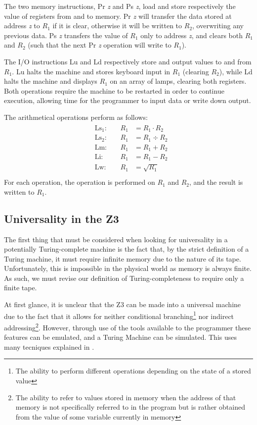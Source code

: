 \documentclass[Master.tex]{subfiles}
\begin{document}
The two memory instructions, Pr \textit{z} and Ps \textit{z}, load and store respectively the value of registers from and to memory. Pr \textit{z} will transfer the data stored at address \textit{z} to $R_1$ if it is clear, otherwise it will be written to $R_2$, overwriting any previous data. Ps \textit{z} transfers the value of $R_1$ only to address \textit{z}, and clears both $R_1$ and $R_2$ (such that the next Pr \textit{z} operation will write to $R_1$). 

The I/O instructions Lu and Ld respectively store and output values to and from $R_1$. Lu halts the machine and stores keyboard input in $R_1$ (clearing $R_2$), while Ld halts the machine and displays $R_1$ on an array of lamps, clearing both registers. Both operations require the machine to be restarted in order to continue execution, allowing time for the programmer to input data or write down output.

The arithmetical operations perform as follows:
\begin{gather*}
\begin{aligned}
&\mathrm{Ls_1}:\quad	&R_1 &= R_1 \cdot R_2 \\
&\mathrm{Ls_2}:\quad	&R_1 &= R_1 \div R_2 \\
&\mathrm{Lm}:\quad	&R_1 &= R_1 + R_2 \\
&\mathrm{Li}:\quad	&R_1 &= R_1 - R_2 \\
&\mathrm{Lw}:\quad	&R_1 &= \sqrt{R_1} \\
\end{aligned}
\end{gather*}
For each operation, the operation is performed on $R_1$ and $R_2$, and the result is written to $R_1$. 
\subsection{Universality in the Z3}

The first thing that must be considered when looking for universality in a potentially Turing-complete machine is the fact that, by the strict definition of a Turing machine, it must require infinite memory due to the nature of its tape. Unfortunately, this is impossible in the physical world as memory is always finite. As such, we must revise our definition of Turing-completeness to require only a finite tape.

At first glance, it is unclear that the Z3 can be made into a universal machine due to the fact that it allows for neither conditional branching\footnote{The ability to perform different operations depending on the state of a stored value} nor indirect addressing\footnote{The ability to refer to values stored in memory when the address of that memory is not specifically referred to in the program but is rather obtained from the value of some variable currently in memory}. However, through use of the tools available to the programmer these features can be emulated, and a Turing Machine can be simulated. This uses many tecniques explained in \cite{rojas1998z3universal}.
\end{document}
